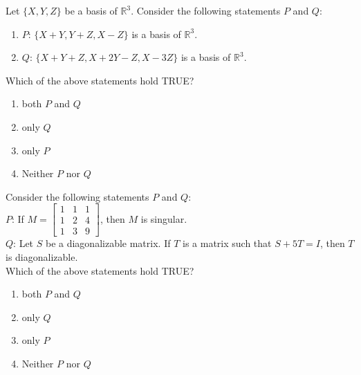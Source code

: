 \iffalse
                       
                        
                        
                        
                    
                        \author{AI24BTECH11006 - Bugada Roopansha}
                        \section{ma}
                        \chapter{2016}
                        \fi
 
    \item Let $\{X, Y, Z\}$ be a basis of $\mathbb{R}^3$. Consider the following statements $P$ and $Q$: 
    \begin{enumerate}
        \item $P$: $\{X+Y, Y+Z, X-Z\}$ is a basis of $\mathbb{R}^3$.
        \item $Q$: $\{X + Y + Z, X+2Y - Z, X-3Z\}$ is a basis of $\mathbb{R}^3$.
    \end{enumerate}
    Which of the above statements hold TRUE?
    \begin{enumerate}
        \item both $P$ and $Q$
        \item only $Q$
        \item only $P$
        \item Neither $P$ nor $Q$
    \end{enumerate}

    \item Consider the following statements $P$ and $Q$:\\
      $P$: If $M = \begin{bmatrix} 1 & 1 & 1 \\ 1 & 2 & 4 \\ 1 & 3 & 9 \end{bmatrix}$, then $M$ is singular.\\
 $Q$: Let $S$ be a diagonalizable matrix. If $T$ is a matrix such that $S + 5T = I$, then $T$ is diagonalizable.\\
    Which of the above statements hold TRUE?
    \begin{enumerate}
        \item both $P$ and $Q$
        \item only $Q$
        \item only $P$
        \item Neither $P$ nor $Q$
    \end{enumerate}

